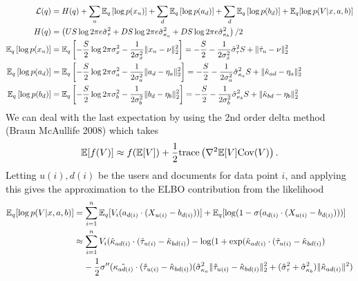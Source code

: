 \documentclass{article}
\begin{document}
\begin{equation*}
\begin{split}
\mathcal{L}(q) 
&= H(q) +  \sum_{u} \mathbb{E}_q\left[\log p(x_{u})\right] +\sum_{d} \mathbb{E}_q\left[\log p(a_d)\right] + \sum_{d} \mathbb{E}_q\left[\log p(b_d)\right] + \mathbb{E}_q[\log p(V|x,a,b)] \\
H(q) 
&= \left(US\log 2\pi e\hat{\sigma}^2_\tau + DS\log 2\pi e\hat{\sigma}^2_{\kappa_a} + DS\log 2\pi e\hat{\sigma}^2_{\kappa_b}\right)/2 \\
\mathbb{E}_q\left[\log p(x_{u})\right] 
&= \mathbb{E}_q\left[-\frac{S}{2} \log 2\pi \sigma^2_x - \frac{1}{2\sigma^2_x} \|x_u - \nu\|_2^2\right]
= -\frac{S}{2} - \frac{1}{2\sigma^2_x} \hat{\sigma}^2_\tau S + \|\hat{\tau}_u - \nu\|^2_2\\
\mathbb{E}_q\left[\log p(a_d)\right] & = \mathbb{E}_q\left[-\frac{S}{2} \log 2\pi \sigma^2_a - \frac{1}{2\sigma^2_a} \|a_d - \eta_a\|_2^2\right]
= -\frac{S}{2} - \frac{1}{2\sigma^2_a}  \hat{\sigma}^2_{\kappa_a} S + \|\hat{\kappa}_{ad} - \eta_a\|^2_2\\
\mathbb{E}_q\left[\log p(b_d)\right] & = \mathbb{E}_q\left[-\frac{S}{2} \log 2\pi \sigma^2_b - \frac{1}{2\sigma^2_b} \|b_d - \eta_b\|_2^2\right]
= -\frac{S}{2} - \frac{1}{2\sigma^2_b} \hat{\sigma}^2_{\kappa_b} S + \|\hat{\kappa}_{bd} - \eta_b\|^2_2
\end{split}
\end{equation*}
We can deal with the last expectation by using the 2nd order delta method (Braun McAullife 2008) which takes
\begin{align*}
\mathbb{E}[f(V)] \approx f(\mathbb{E}[V]) + \frac{1}{2} \text{trace}\left(\nabla^2 \mathbb{E}[V] \mathrm{Cov}(V)\right).
\end{align*}
Letting $u(i),d(i)$ be the users and documents for data point $i$, and applying this gives the approximation to the ELBO contribution from the likelihood %
\begin{align*}
\mathbb{E}_q[\log p(V|x,a,b)] & = \sum_{i=1}^n \mathbb{E}_q[V_i(a_{d(i)} \cdot (X_{u(i)} - b_{d(i)}))] + \mathbb{E}_q[\log (1-\sigma(a_{d(i)} \cdot (X_{u(i)} - b_{d(i)})))]\\
& \approx \sum_{i=1}^nV_i (\hat{\kappa}_{ad(i)} \cdot (\hat{\tau}_{u(i)} - \hat{\kappa}_{bd(i)}) - \log (1 + \exp(\hat{\kappa}_{ad(i)} \cdot (\hat{\tau}_{u(i)} - \hat{\kappa}_{bd(i)})\\
& \;\;\;\; - \frac{1}{2} \sigma''(\hat{\kappa_{ad(i)}} \cdot (\hat{\tau}_{u(i)} - \hat{\kappa}_{bd(i)})(\hat{\sigma}^2_{\kappa_a} \|\hat{\tau}_{u(i)} - \hat{\kappa}_{bd(i)}\|_2^2 + (\hat{\sigma}^2_{\tau} + \hat{\sigma}^2_{\kappa_b})\|\hat{\kappa}_{ad(i)}\|^2)
\end{align*}
\end{document}
